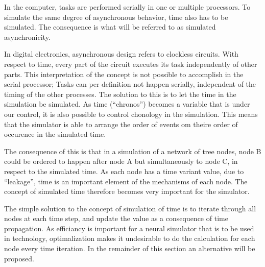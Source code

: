 	In the computer, tasks are performed serially in one or multiple processors.
	To simulate the same degree of asynchronous behavior, time also has to be simulated. %
	The consequence is what will be referred to as simulated asynchronicity.

	In digital electronics, asynchronous design refers to clockless circuits. 
	With respect to time, every part of the circuit executes its task independently of other parts.
	This interpretation of the concept is not possible to accomplish in the serial processor; Tasks can per definition not happen serially, independent of the timing of the other processes.
	The solution to this is to let the time in the simulation be simulated.
	As time (``chronos'') becomes a variable that is under our control, it is also possible to control chonology in the simulation. %
	This means that the simulator is able to arrange the order of events om theire order of occurence in the simulated time. %
	
	The consequence of this is that in a simulation of a network of tree nodes, node B could be ordered to happen after node A but simultaneously to node C, in respect to the simulated time. %
	As each node has a time variant value, due to ``leakage'', time is an important element of the mechanisms of each node.
	The concept of simulated time therefore becomes very important for the simulator.  %

	The simple solution to the concept of simulation of time is to iterate through all nodes at each time step, and update the value as a consequence of time propagation.
	As efficiancy is important for a neural simulator that is to be used in technology, optimalization makes it undesirable to do the calculation for each node every time iteration.
	In the remainder of this section an alternative will be proposed.

